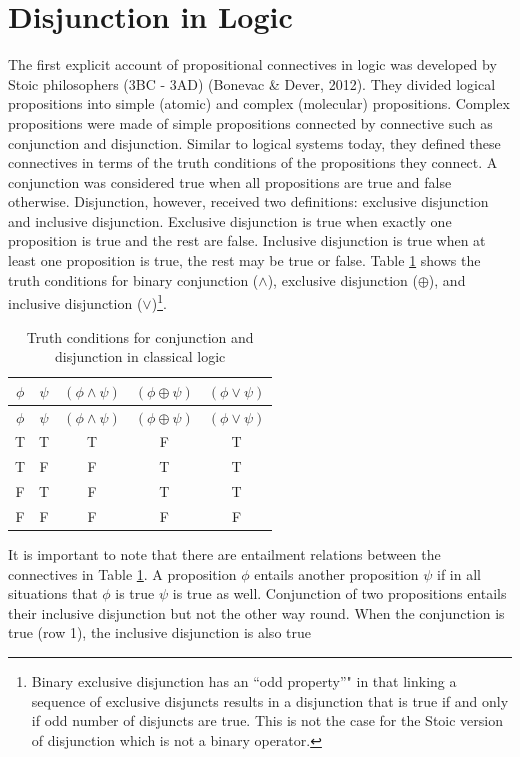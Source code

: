 \documentclass[oneside]{report}
\theoremstyle{definition}
\theoremstyle{definition}
\theoremstyle{definition}
\theoremstyle{remark}
\begin{document}
\section{Disjunction in Logic}\label{logic}

The first explicit account of propositional connectives in logic was
developed by Stoic philosophers (3BC - 3AD) (Bonevac \& Dever, 2012).
They divided logical propositions into simple (atomic) and complex
(molecular) propositions. Complex propositions were made of simple
propositions connected by connective such as conjunction and
disjunction. Similar to logical systems today, they defined these
connectives in terms of the truth conditions of the propositions they
connect. A conjunction was considered true when all propositions are
true and false otherwise. Disjunction, however, received two
definitions: exclusive disjunction and inclusive disjunction. Exclusive
disjunction is true when exactly one proposition is true and the rest
are false. Inclusive disjunction is true when at least one proposition
is true, the rest may be true or false. Table \ref{tab:truthtable} shows
the truth conditions for binary conjunction (\(\land\)), exclusive
disjunction (\(\oplus\)), and inclusive disjunction (\(\lor\))\footnote{Binary
  exclusive disjunction has an ``odd property''" in that linking a
  sequence of exclusive disjuncts results in a disjunction that is true
  if and only if odd number of disjuncts are true. This is not the case
  for the Stoic version of disjunction which is not a binary operator.}.
\begin{longtable}[]{@{}ccccc@{}}
\caption{\label{tab:truthtable} Truth conditions for conjunction and
disjunction in classical logic}\tabularnewline
\toprule
\(\phi\) & \(\psi\) & \((\phi \land \psi)\) & \((\phi \oplus \psi)\) &
\((\phi \lor \psi)\)\tabularnewline
\midrule
\endfirsthead
\toprule
\(\phi\) & \(\psi\) & \((\phi \land \psi)\) & \((\phi \oplus \psi)\) &
\((\phi \lor \psi)\)\tabularnewline
\midrule
\endhead
T & T & T & F & T\tabularnewline
T & F & F & T & T\tabularnewline
F & T & F & T & T\tabularnewline
F & F & F & F & F\tabularnewline
\bottomrule
\end{longtable}
It is important to note that there are entailment relations between the
connectives in Table \ref{tab:truthtable}. A proposition \(\phi\)
entails another proposition \(\psi\) if in all situations that \(\phi\)
is true \(\psi\) is true as well. Conjunction of two propositions
entails their inclusive disjunction but not the other way round. When
the conjunction is true (row 1), the inclusive disjunction is also true
\end{document}
